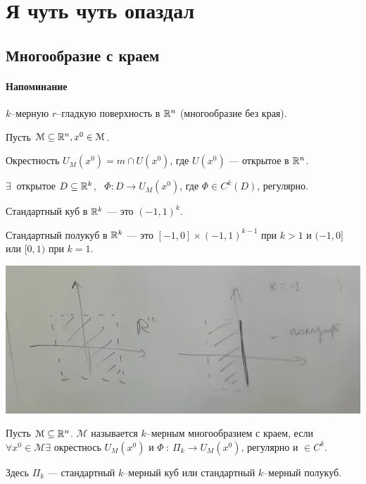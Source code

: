 \section{Я чуть  чуть опаздал}

\subsection{Многообразие с краем}

\paragraph*{Напоминание}

$k$--мерную $r$--гладкую поверхность в $\mathbb{R}^n$ (многообразие без края).

Пусть $\mathcal M \subseteq \mathbb{R}^n, x^0 \in \mathcal M$.

Окрестность $U_M (x^0) = m \cap U(x^0)$, где $U(x^0)$ --- открытое в $\mathbb{R}^n$.

$\exists ~$ открытое $D \subseteq \mathbb{R}^k$, ~$\Phi : D \to U_M(x^0)$, где
$\Phi \in C^k (D)$, регулярно.

\begin{definition}
    Стандартный куб в $\mathbb{R}^k$ --- это $(-1, 1)^k$.
\end{definition}

\begin{definition}
    Стандартный полукуб в $\mathbb{R}^k$ --- это $[-1, 0] \times (-1, 1)^{k -1}$ при $k > 1$ и $(-1, 0]$ или $[0, 1)$ при $k = 1$.
\end{definition}

\begin{center}
    \includegraphics[scale=0.55]{img/simple-squere-and-halfsquere.png}
\end{center}

\begin{definition}
Пусть $\mathcal M \subseteq \mathbb{R}^n$. $\mathcal M$ называется $k$--мерным многообразием с краем, если $\forall x^0 \in \mathcal M \exists $ окрестнось $U_M (x^0)$ и $\Phi ~:~ \Pi_k \to U_M (x^0)$, регулярно и $\in C^k$.

Здесь $\Pi_k$ --- стандартный $k$--мерный куб или стандартный $k$--мерный полукуб.
\end{definition}

